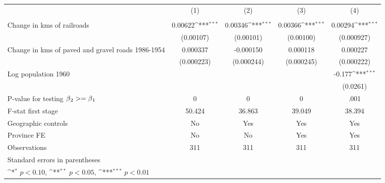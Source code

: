 {
\def\sym#1{\ifmmode^{#1}\else\(^{#1}\)\fi}
\begin{tabular}{l*{4}{c}}
\hline\hline
                &\multicolumn{1}{c}{(1)}&\multicolumn{1}{c}{(2)}&\multicolumn{1}{c}{(3)}&\multicolumn{1}{c}{(4)}\\
                &\multicolumn{1}{c}{}&\multicolumn{1}{c}{}&\multicolumn{1}{c}{}&\multicolumn{1}{c}{}\\
\hline
Change in kms of railroads&  0.00622\sym{***}&  0.00346\sym{***}&  0.00366\sym{***}&  0.00294\sym{***}\\
                &(0.00107)         &(0.00101)         &(0.00100)         &(0.000927)         \\
[1em]
Change in kms of paved and gravel roads 1986-1954& 0.000337         &-0.000150         & 0.000118         & 0.000227         \\
                &(0.000223)         &(0.000244)         &(0.000245)         &(0.000222)         \\
[1em]
Log population 1960&                  &                  &                  &   -0.177\sym{***}\\
                &                  &                  &                  & (0.0261)         \\
\hline
P-value for testing $\beta\\_2 >= \beta\\_1$&        0         &        0         &        0         &     .001         \\
F-stat first stage&   50.424         &   36.863         &   39.049         &   38.394         \\
Geographic controls&       No         &      Yes         &      Yes         &      Yes         \\
Province FE     &       No         &       No         &      Yes         &      Yes         \\
Observations    &      311         &      311         &      311         &      311         \\
\hline\hline
\multicolumn{5}{l}{\footnotesize Standard errors in parentheses}\\
\multicolumn{5}{l}{\footnotesize \sym{*} \(p<0.10\), \sym{**} \(p<0.05\), \sym{***} \(p<0.01\)}\\
\end{tabular}
}

